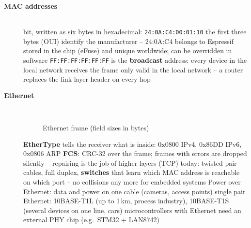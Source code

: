 \begin{description}
\item[{\rot\bf MAC addresses}]~\\[-\lblskip]
\bi
	 bit, written as six bytes in hexadecimal: \texttt{24:0A:C4:00:01:10}
	\ite the first three bytes (OUI) identify the manufacturer -- 24:0A:C4 belongs to Espressif
	\ite stored in the chip (eFuse) and unique worldwide; can be overridden in software
	\ite \texttt{FF:FF:FF:FF:FF:FF} is the \textbf{broadcast} address: every device in the local network receives the frame
	\ite only valid in the local network -- a router replaces the link layer header on every hop
\ei
\os{\newpage}

\item[{\rot\bf Ethernet}]~\\[-\lblskip]
\begin{figure}[!hbtp]
\begin{center}
\caption{Ethernet frame (field sizes in bytes)}
\end{center}
\end{figure}
\bi
	\ite \textbf{EtherType} tells the receiver what is inside: 0x0800 IPv4, 0x86DD IPv6, 0x0806 ARP
	\ite \textbf{FCS}: CRC-32 over the frame; frames with errors are dropped silently -- repairing is the job of higher layers (TCP)
	\ite today: twisted pair cables, full duplex, \textbf{switches} that learn which MAC address is reachable on which port -- no collisions any more
	\ite for embedded systems
	\bi
		\ite Power over Ethernet: data and power on one cable (cameras, access points)
		\ite single pair Ethernet: 10BASE-T1L (up to 1\,km, process industry), 10BASE-T1S (several devices on one line, cars)
		\ite microcontrollers with Ethernet need an external PHY chip (e.g.\ STM32 + LAN8742)
	\ei
\ei
\os{\newpage}


\end{description}
